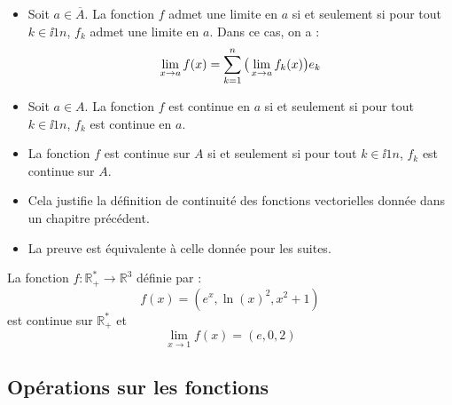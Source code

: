 \documentclass[french,11pt,twoside]{VcCours}
\begin{document}
\begin{Proposition}{} 

\begin{itemize}
\item Soit $a \in \overline{A}$. La fonction $f$ admet une limite en $a$ si et seulement si pour tout $k \in\ii{1}{n}$, $f_k$ admet une limite en $a$. Dans ce cas, on a :
$$ \lim_{x \rightarrow a} f(x) =  \sum_{k=1}^n \big{(} \lim_{x \rightarrow a} f_k(x) \big{)} e_k$$
\item Soit $a \in A$. La fonction $f$ est continue en $a$ si et seulement si pour tout $k \in\ii{1}{n}$, $f_k$ est continue en $a$.
\item La fonction $f$ est continue sur $A$ si et seulement si pour tout $k \in\ii{1}{n}$, $f_k$ est continue sur $A$.
\end{itemize}
\end{Proposition}

\begin{Remarques}{}
\begin{itemize}
\item Cela justifie la définition de continuité des fonctions vectorielles donnée dans un chapitre précédent.
\item La preuve est équivalente à celle donnée pour les suites.
\end{itemize}
\end{Remarques}{}

\medskip

\begin{Exemple} La fonction $f : \mathbb{R}_+^* \rightarrow \mathbb{R}^3$ définie par :
$$ f(x) = (e^x, \ln(x)^2, x^2+1)$$
est continue sur $\mathbb{R}_+^*$ et 
$$ \lim_{x \rightarrow 1} f(x) = (e,0,2)$$
\end{Exemple}
%
%

\subsection{Opérations sur les fonctions}
\end{document}
